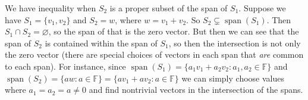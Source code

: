 \documentclass[11pt]{article}
\newcommand{\cbr}[1]{\{#1\}}
\DeclareMathOperator{\Span}{span}
\begin{document}
We have inequality when $S_2$ is a proper subset of the span of $S_1$. Suppose we have $S_1 = \cbr{v_1,v_2}$ and $S_2 = {w}$, where $w = v_1+v_2$. So $S_2 \subsetneq \Span(S_1)$. Then $S_1\cap S_2 = \varnothing$, so the span of that is the zero vector. But then we can see that the span of $S_2$ is contained within the span of $S_1$, so then the intersection is not only the zero vector (there are special choices of vectors in each span that \textit{are} common to each span). For instance, since $\Span(S_1) = \cbr{a_1v_1 + a_2v_2 : a_1,a_2\in\mathbb{F}}$ and $\Span(S_2) = \cbr{aw : a\in\mathbb{F}} = \cbr{av_1+av_2 : a\in\mathbb{F}}$ we can simply choose values where $a_1=a_2=a \neq 0$ and find nontrivial vectors in the intersection of the spans.
\end{document}
